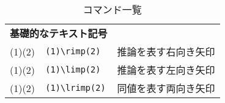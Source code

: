 \documentclass[uplatex, dvipdfmx, 12pt, crop=false]{standalone}
\begin{document}
\newcommand{\tablesubtitle}[1]{\multicolumn{2}{c}{\textbf{#1}}}

\begin{table}[htb]
	\centering
	\renewcommand{\arraystretch}{1.2}
	\caption{コマンド一覧}
	\begin{tabular}{ll@{\qquad}l}
		\hline
		\hline
		\tablesubtitle{基礎的なテキスト記号} \\
		(1)\rimp(2)  & \verb|(1)\rimp(2)|  & 推論を表す右向き矢印 \\
		(1)\limp(2)  & \verb|(1)\limp(2)|  & 推論を表す左向き矢印 \\
		(1)\lrimp(2) & \verb|(1)\lrimp(2)| & 同値を表す両向き矢印 \\
		\hline


\end{tabular}
\end{table}
\end{document}
